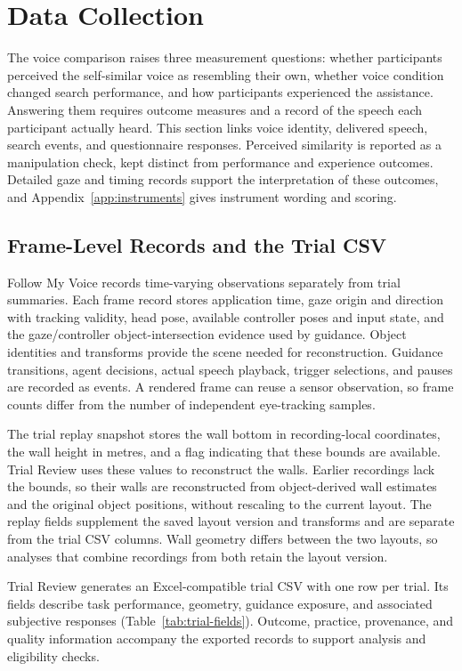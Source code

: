 \section{Data Collection}
\label{ch:measurement}
The voice comparison raises three measurement questions: whether participants perceived the self-similar voice as resembling their own, whether voice condition changed search performance, and how participants experienced the assistance. Answering them requires outcome measures and a record of the speech each participant actually heard. This section links voice identity, delivered speech, search events, and questionnaire responses. Perceived similarity is reported as a manipulation check, kept distinct from performance and experience outcomes. Detailed gaze and timing records support the interpretation of these outcomes, and Appendix~\ref{app:instruments} gives instrument wording and scoring.


\subsection{Frame-Level Records and the Trial CSV}
Follow My Voice records time-varying observations separately from trial summaries. Each frame record stores application time, gaze origin and direction with tracking validity, head pose, available controller poses and input state, and the gaze/controller object-intersection evidence used by guidance. Object identities and transforms provide the scene needed for reconstruction. Guidance transitions, agent decisions, actual speech playback, trigger selections, and pauses are recorded as events. A rendered frame can reuse a sensor observation, so frame counts differ from the number of independent eye-tracking samples.

The trial replay snapshot stores the wall bottom in recording-local coordinates, the wall height in metres, and a flag indicating that these bounds are available. Trial Review uses these values to reconstruct the walls. Earlier recordings lack the bounds, so their walls are reconstructed from object-derived wall estimates and the original object positions, without rescaling to the current layout. The replay fields supplement the saved layout version and transforms and are separate from the trial CSV columns. Wall geometry differs between the two layouts, so analyses that combine recordings from both retain the layout version.

Trial Review generates an Excel-compatible trial CSV with one row per trial. Its fields describe task performance, geometry, guidance exposure, and associated subjective responses (Table~\ref{tab:trial-fields}). Outcome, practice, provenance, and quality information accompany the exported records to support analysis and eligibility checks.


